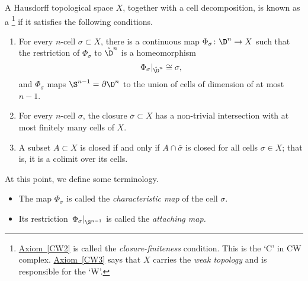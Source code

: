 \documentclass[main.tex]{subfiles}
\begin{document}
\begin{definition}[CW complex]
  \label{def:cw_complex}
  A Hausdorff topological space $X$, together with a cell decomposition, is known as a \footnote{\hyperref[CW2]{Axiom~\ref*{CW2}} is called the \emph{closure-finiteness} condition. This is the `C' in CW complex. \hyperref[CW3]{Axiom~\ref*{CW3}} says that $X$ carries the \emph{weak topology} and is responsible for the `W'.} if it satisfies the following conditions.
  \begin{enumerate}[label=(CW\arabic*), leftmargin=*]
    \item \label{CW1} For every $n$-cell $\sigma \subset X$, there is a continuous map $\Phi_{\sigma}\colon \D^{n} \to X$ such that the restriction of $\Phi_{\sigma}$ to $\mathring{\D}^{n}$ is a homeomorphism
      \begin{equation*}
        \left. \Phi_{\sigma} \right|_{\mathring{\D}^{n}} \cong \sigma,
      \end{equation*}
      and $\Phi_{\sigma}$ maps $\S^{n-1} = \partial \D^{n}$ to the union of cells of dimension of at most $n-1$.

    \item \label{CW2} For every $n$-cell $\sigma$, the closure $\bar{\sigma} \subset X$ has a non-trivial intersection with at most finitely many cells of $X$.

    \item \label{CW3} A subset $A \subset X$ is closed if and only if $A \cap \bar{\sigma}$ is closed for all cells $\sigma \in X$; that is, it is a colimit over its cells.
  \end{enumerate}
\end{definition}

At this point, we define some terminology.
\begin{itemize}
  \item The map $\Phi_{\sigma}$ is called the \emph{characteristic map} of the cell $\sigma$.

  \item Its restriction $\left. \Phi_{\sigma} \right|_{\S^{n-1}}$ is called the \emph{attaching map.}
\end{itemize}
\end{document}
